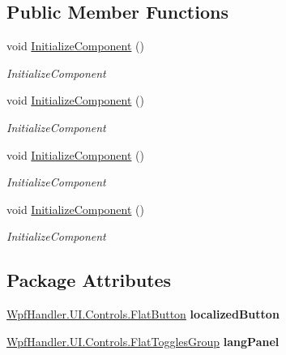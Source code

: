\subsection*{Public Member Functions}
\begin{DoxyCompactItemize}
\item 
void \mbox{\hyperlink{class_localization_sample_1_1_main_window_a8d39b36d8b9d44d802902f109dd1f160}{Initialize\+Component}} ()
\begin{DoxyCompactList}\small\item\em Initialize\+Component \end{DoxyCompactList}\item 
void \mbox{\hyperlink{class_localization_sample_1_1_main_window_a8d39b36d8b9d44d802902f109dd1f160}{Initialize\+Component}} ()
\begin{DoxyCompactList}\small\item\em Initialize\+Component \end{DoxyCompactList}\item 
void \mbox{\hyperlink{class_localization_sample_1_1_main_window_a8d39b36d8b9d44d802902f109dd1f160}{Initialize\+Component}} ()
\begin{DoxyCompactList}\small\item\em Initialize\+Component \end{DoxyCompactList}\item 
void \mbox{\hyperlink{class_localization_sample_1_1_main_window_a8d39b36d8b9d44d802902f109dd1f160}{Initialize\+Component}} ()
\begin{DoxyCompactList}\small\item\em Initialize\+Component \end{DoxyCompactList}\end{DoxyCompactItemize}
\subsection*{Package Attributes}
\begin{DoxyCompactItemize}
\item 
\mbox{\label{class_localization_sample_1_1_main_window_a5c96ecd4bb4f2f3afda014026067699e}} 
\mbox{\hyperlink{class_wpf_handler_1_1_u_i_1_1_controls_1_1_flat_button}{Wpf\+Handler.\+U\+I.\+Controls.\+Flat\+Button}} {\bfseries localized\+Button}
\item 
\mbox{\label{class_localization_sample_1_1_main_window_a4b40d4e16ea71a96feb960c4fd482b82}} 
\mbox{\hyperlink{class_wpf_handler_1_1_u_i_1_1_controls_1_1_flat_toggles_group}{Wpf\+Handler.\+U\+I.\+Controls.\+Flat\+Toggles\+Group}} {\bfseries lang\+Panel}
\end{DoxyCompactItemize}
